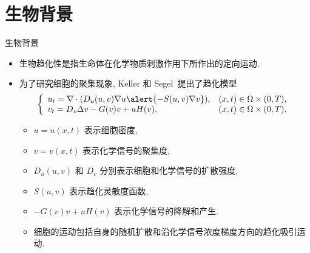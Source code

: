\section{生物背景}

\begin{frame}{生物背景}
  
\begin{itemize}
    \item 生物趋化性是指生命体在化学物质刺激作用下所作出的定向运动.
    \item 为了研究细胞的\alert{聚集}现象, Keller 和 Segel~提出了趋化模型
\begin{equation*}\label{sys: general ks ch1}
	\left\{
	\begin{array}{ll}
		u_t = \nabla\cdot(D_u(u,v)\nabla u \alert{- S(u,v)\nabla v}), & (x, t)\in \Omega\times(0, T), \\
		v_t = D_v\Delta v  - G(v)v + uH(v),                   & (x, t)\in \Omega\times(0, T), \\
	\end{array}
	\right.
\end{equation*}
\begin{itemize}
\item $u = u(x, t)$ 表示细胞密度,
\item $v = v(x, t)$ 表示化学信号的聚集度,
\item $D_u(u,v)$ 和 $D_v$ 分别表示细胞和化学信号的扩散强度,
\item $S(u,v)$ 表示趋化灵敏度函数,
\item $-G(v)v + uH(v)$ 表示化学信号的降解和产生.
\item 细胞的运动包括自身的随机扩散和\alert{沿化学信号浓度梯度方向的趋化吸引运动}.
\end{itemize}
\end{itemize}
\end{frame}